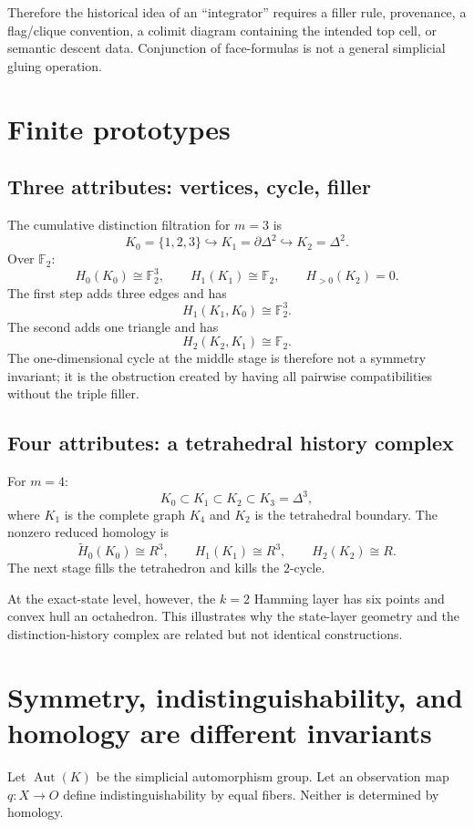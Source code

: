 \documentclass[11pt]{article}
\newcommand{\Ftwo}{\mathbb F_2}
\begin{document}
Therefore the historical idea of an ``integrator'' requires a filler rule, provenance, a flag/clique convention, a colimit diagram containing the intended top cell, or semantic descent data.  Conjunction of face-formulas is not a general simplicial gluing operation.

\section{Finite prototypes}

\subsection{Three attributes: vertices, cycle, filler}
The cumulative distinction filtration for $m=3$ is
\[
K_0=\{1,2,3\}
\hookrightarrow
K_1=\partial\Delta^2
\hookrightarrow
K_2=\Delta^2.
\]
Over $\Ftwo$:
\[
H_0(K_0)\cong\Ftwo^3,
\qquad
H_1(K_1)\cong\Ftwo,
\qquad
H_{>0}(K_2)=0.
\]
The first step adds three edges and has
\[
H_1(K_1,K_0)\cong\Ftwo^3.
\]
The second adds one triangle and has
\[
H_2(K_2,K_1)\cong\Ftwo.
\]
The one-dimensional cycle at the middle stage is therefore not a symmetry invariant; it is the obstruction created by having all pairwise compatibilities without the triple filler.

\subsection{Four attributes: a tetrahedral history complex}
For $m=4$:
\[
K_0\subset K_1\subset K_2\subset K_3=\Delta^3,
\]
where $K_1$ is the complete graph $K_4$ and $K_2$ is the tetrahedral boundary.  The nonzero reduced homology is
\[
\widetilde H_0(K_0)\cong R^3,\qquad
H_1(K_1)\cong R^3,\qquad
H_2(K_2)\cong R.
\]
The next stage fills the tetrahedron and kills the $2$-cycle.

At the exact-state level, however, the $k=2$ Hamming layer has six points and convex hull an octahedron.  This illustrates why the state-layer geometry and the distinction-history complex are related but not identical constructions.

\section{Symmetry, indistinguishability, and homology are different invariants}

Let $\operatorname{Aut}(K)$ be the simplicial automorphism group.  Let an observation map $q:X\to O$ define indistinguishability by equal fibers.  Neither is determined by homology.
\end{document}
